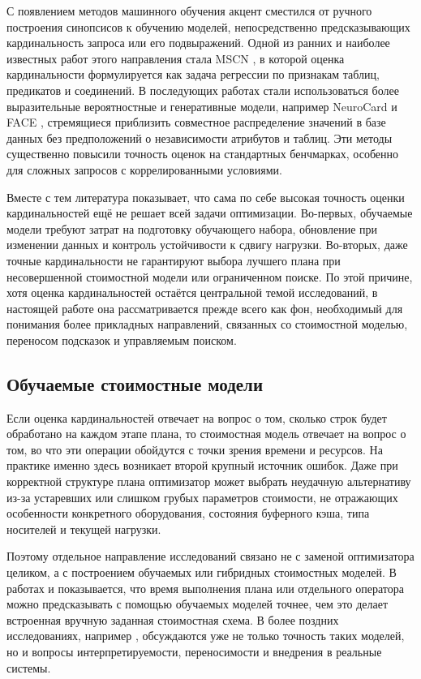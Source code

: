 С появлением методов машинного обучения акцент сместился от ручного построения синопсисов к обучению моделей, непосредственно предсказывающих кардинальность запроса или его подвыражений. Одной из ранних и наиболее известных работ этого направления стала MSCN \cite{kipf2018learnedcardinalitiesestimatingcorrelated}, в которой оценка кардинальности формулируется как задача регрессии по признакам таблиц, предикатов и соединений. В последующих работах стали использоваться более выразительные вероятностные и генеративные модели, например NeuroCard \cite{10.14778/3421424.3421432} и FACE \cite{10.14778/3485450.3485458}, стремящиеся приблизить совместное распределение значений в базе данных без предположений о независимости атрибутов и таблиц. Эти методы существенно повысили точность оценок на стандартных бенчмарках, особенно для сложных запросов с коррелированными условиями.

Вместе с тем литература показывает, что сама по себе высокая точность оценки кардинальностей ещё не решает всей задачи оптимизации. Во-первых, обучаемые модели требуют затрат на подготовку обучающего набора, обновление при изменении данных и контроль устойчивости к сдвигу нагрузки. Во-вторых, даже точные кардинальности не гарантируют выбора лучшего плана при несовершенной стоимостной модели или ограниченном поиске. По этой причине, хотя оценка кардинальностей остаётся центральной темой исследований, в настоящей работе она рассматривается прежде всего как фон, необходимый для понимания более прикладных направлений, связанных со стоимостной моделью, переносом подсказок и управляемым поиском.

\subsection{Обучаемые стоимостные модели}

Если оценка кардинальностей отвечает на вопрос о том, сколько строк будет обработано на каждом этапе плана, то стоимостная модель отвечает на вопрос о том, во что эти операции обойдутся с точки зрения времени и ресурсов. На практике именно здесь возникает второй крупный источник ошибок. Даже при корректной структуре плана оптимизатор может выбрать неудачную альтернативу из-за устаревших или слишком грубых параметров стоимости, не отражающих особенности конкретного оборудования, состояния буферного кэша, типа носителей и текущей нагрузки.

Поэтому отдельное направление исследований связано не с заменой оптимизатора целиком, а с построением обучаемых или гибридных стоимостных моделей. В работах \cite{10.1145/3318464.3380584} и \cite{10.1145/3511808.3557305} показывается, что время выполнения плана или отдельного оператора можно предсказывать с помощью обучаемых моделей точнее, чем это делает встроенная вручную заданная стоимостная схема. В более поздних исследованиях, например \cite{10.14778/3750601.3750645}, обсуждаются уже не только точность таких моделей, но и вопросы интерпретируемости, переносимости и внедрения в реальные системы.

